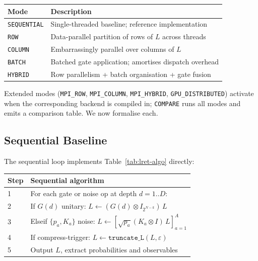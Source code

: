 \documentclass[11pt,a4paper]{article}
\begin{document}
\begin{center}
\renewcommand{\arraystretch}{1.2}
\begin{tabular}{@{}lp{7.5cm}@{}}
\toprule
\textbf{Mode} & \textbf{Description} \\
\midrule
\texttt{SEQUENTIAL} & Single-threaded baseline; reference implementation \\
\texttt{ROW}        & Data-parallel partition of rows of $L$ across threads \\
\texttt{COLUMN}     & Embarrassingly parallel over columns of $L$ \\
\texttt{BATCH}      & Batched gate application; amortises dispatch overhead \\
\texttt{HYBRID}     & Row parallelism + batch organisation + gate fusion \\
\bottomrule
\end{tabular}
\end{center}

Extended modes (\texttt{MPI\_ROW}, \texttt{MPI\_COLUMN}, \texttt{MPI\_HYBRID},
\texttt{GPU\_DISTRIBUTED}) activate when the corresponding backend is compiled in;
\texttt{COMPARE} runs all modes and emits a comparison table. We now formalise each.

\subsection{Sequential Baseline}
\label{sec:seq-mode}

The sequential loop implements Table~\ref{tab:lret-algo} directly:

\begin{algorithm}[!h]
\renewcommand{\arraystretch}{1.1}
\begin{tabular}{@{}lp{11.5cm}@{}}
\toprule
\textbf{Step} & \textbf{Sequential algorithm} \\
\midrule
1 & For each gate or noise op at depth $d=1..D$: \\
2 & \quad If $G(d)$ unitary: $L \leftarrow (G(d) \otimes I_{2^{N-k}})\,L$ \\
3 & \quad Elseif $\{p_a,K_a\}$ noise: $L \leftarrow [\sqrt{p_a}(K_a \otimes I)\,L]_{a=1}^{A}$ \\
4 & \quad If compress-trigger: $L \leftarrow \texttt{truncate\_L}(L,\varepsilon)$ \\
5 & Output $L$, extract probabilities and observables \\
\bottomrule
\end{tabular}
\end{algorithm}
\end{document}
